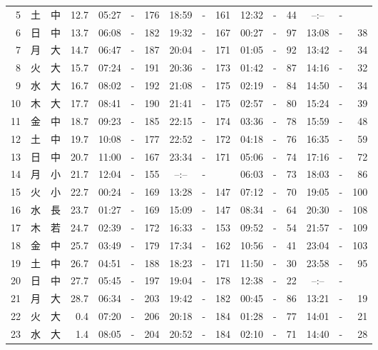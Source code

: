 \documentclass[12pt.a4j]{jsarticle}
\begin{document}
\begin{center}
\begin{table}[ht]
\begin{tabular}{|rc|cr|ccrccr|ccrccr|}
 5 & 土 & 中 & 12.7 &  05:27 &-& 176  &  18:59 &-& 161  &   12:32 &-&  44  &   --:-- &-&     \\
 6 & 日 & 中 & 13.7 &  06:08 &-& 182  &  19:32 &-& 167  &   00:27 &-&  97  &   13:08 &-&  38  \\
 7 & 月 & 大 & 14.7 &  06:47 &-& 187  &  20:04 &-& 171  &   01:05 &-&  92  &   13:42 &-&  34  \\
 8 & 火 & 大 & 15.7 &  07:24 &-& 191  &  20:36 &-& 173  &   01:42 &-&  87  &   14:16 &-&  32  \\
 9 & 水 & 大 & 16.7 &  08:02 &-& 192  &  21:08 &-& 175  &   02:19 &-&  84  &   14:50 &-&  34  \\
10 & 木 & 大 & 17.7 &  08:41 &-& 190  &  21:41 &-& 175  &   02:57 &-&  80  &   15:24 &-&  39  \\
11 & 金 & 中 & 18.7 &  09:23 &-& 185  &  22:15 &-& 174  &   03:36 &-&  78  &   15:59 &-&  48  \\
12 & 土 & 中 & 19.7 &  10:08 &-& 177  &  22:52 &-& 172  &   04:18 &-&  76  &   16:35 &-&  59  \\
13 & 日 & 中 & 20.7 &  11:00 &-& 167  &  23:34 &-& 171  &   05:06 &-&  74  &   17:16 &-&  72  \\
14 & 月 & 小 & 21.7 &  12:04 &-& 155  &  --:-- &-&     &   06:03 &-&  73  &   18:03 &-&  86  \\
15 & 火 & 小 & 22.7 &  00:24 &-& 169  &  13:28 &-& 147  &   07:12 &-&  70  &   19:05 &-& 100  \\
16 & 水 & 長 & 23.7 &  01:27 &-& 169  &  15:09 &-& 147  &   08:34 &-&  64  &   20:30 &-& 108  \\
17 & 木 & 若 & 24.7 &  02:39 &-& 172  &  16:33 &-& 153  &   09:52 &-&  54  &   21:57 &-& 109  \\
18 & 金 & 中 & 25.7 &  03:49 &-& 179  &  17:34 &-& 162  &   10:56 &-&  41  &   23:04 &-& 103  \\
19 & 土 & 中 & 26.7 &  04:51 &-& 188  &  18:23 &-& 171  &   11:50 &-&  30  &   23:58 &-&  95  \\
20 & 日 & 中 & 27.7 &  05:45 &-& 197  &  19:04 &-& 178  &   12:38 &-&  22  &   --:-- &-&     \\
21 & 月 & 大 & 28.7 &  06:34 &-& 203  &  19:42 &-& 182  &   00:45 &-&  86  &   13:21 &-&  19  \\
22 & 火 & 大 &  0.4 &  07:20 &-& 206  &  20:18 &-& 184  &   01:28 &-&  77  &   14:01 &-&  21  \\
23 & 水 & 大 &  1.4 &  08:05 &-& 204  &  20:52 &-& 184  &   02:10 &-&  71  &   14:40 &-&  28  \\

\end{tabular}
\end{table}
\end{center}
\end{document}
